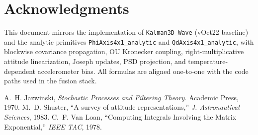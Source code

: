 \documentclass[11pt]{article}
\begin{document}
\section*{Acknowledgments}
This document mirrors the implementation of \texttt{Kalman3D\_Wave} (vOct22 baseline) and
the analytic primitives \texttt{PhiAxis4x1\_analytic} and \texttt{QdAxis4x1\_analytic}, with
blockwise covariance propagation, OU Kronecker coupling, right-multiplicative attitude
linearization, Joseph updates, PSD projection, and temperature-dependent accelerometer bias.
All formulas are aligned one-to-one with the code paths used in the fusion stack.


\begin{thebibliography}{9}
A.~H. Jazwinski, \emph{Stochastic Processes and Filtering Theory}. Academic Press, 1970.
M.~D. Shuster, ``A survey of attitude representations,'' \emph{J. Astronautical Sciences}, 1983.
C.~F. Van Loan, ``Computing Integrals Involving the Matrix Exponential,'' \emph{IEEE TAC}, 1978.
\end{thebibliography}
\end{document}
